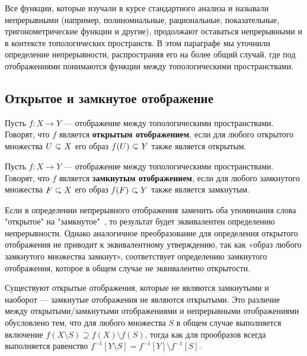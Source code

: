 \begin{remark}
	Все функции, которые изучали в курсе стандартного анализа и называли непрерывными (например, полиномиальные, рациональные, показательные, тригонометрические функции и другие), продолжают оставаться непрерывными и в контексте топологических пространств. В этом параграфе мы уточнили определение непрерывности, распространяя его на более общий случай, где под отображениями понимаются функции между топологическими пространствами.
\end{remark}

\subsection{Открытое и замкнутое отображение}

\begin{definition}
	Пусть \( f : X \to Y \) — отображение между топологическими пространствами. Говорят, что \( f \) является \textbf{открытым отображением}, если для любого открытого множества \( U \open X \) его образ \( f(U) \open Y \) также является открытым.
\end{definition}

\begin{definition}
	Пусть \( f : X \to Y \) — отображение между топологическими пространствами. Говорят, что \( f \) является \textbf{замкнутым отображением}, если для любого замкнутого множества \( F \closed X \) его образ \( f(F) \closed Y \) также является замкнутым.
\end{definition}

\begin{remark}
	Если в определении непрерывного отображения заменить оба упоминания слова "открытое" на "замкнутое"\ , то результат будет эквивалентен определению непрерывности. Однако аналогичное преобразование для определения открытого отображения не приводит к эквивалентному утверждению, так как «образ любого замкнутого множества замкнут», соответствует определению замкнутого отображения, которое в общем случае не эквивалентно открытости.

	Существуют открытые отображения, которые не являются замкнутыми и наоборот — замкнутые отображения не являются открытыми. Это различие между открытыми/замкнутыми отображениями и непрерывными отображениями обусловлено тем, что для любого множества \( S \) в общем случае выполняется включение \( f(X \setminus S) \supseteq f(X) \setminus f(S) \), тогда как для прообразов всегда выполняется равенство \( f^{-1}[Y \setminus S] = f^{-1}[Y] \setminus f^{-1}[S] \).
\end{remark}

